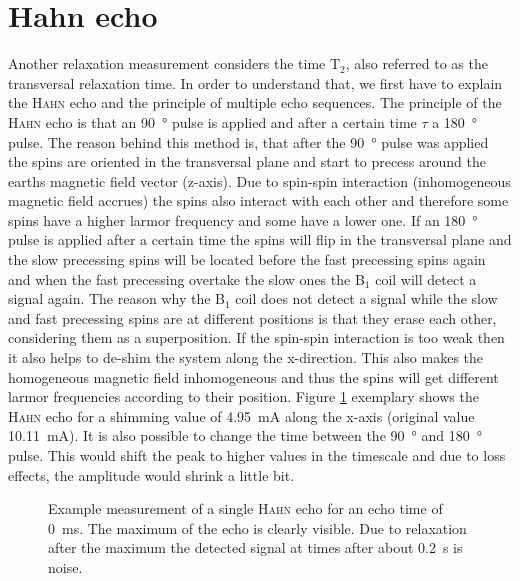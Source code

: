 \section{Hahn echo}
\label{sec:Hahnecho}
Another relaxation measurement considers the time T$_2$, also referred to as the transversal relaxation time.
In order to understand that, we first have to explain the \textsc{Hahn} echo and the principle of multiple echo sequences.\newline
The principle of the \textsc{Hahn} echo is that an \SI{90}{\degree} pulse is applied and after a certain time $\tau$ a \SI{180}{\degree} pulse.
The reason behind this method is, that after the \SI{90}{\degree} pulse was applied the spins are oriented in the transversal plane and start to precess around the earths magnetic field vector (z-axis).
Due to spin-spin interaction (inhomogeneous magnetic field accrues) the spins also interact with each other and therefore some spins have a higher larmor frequency and some have a lower one.
If an \SI{180}{\degree} pulse is applied after a certain time the spins will flip in the transversal plane and the slow precessing spins will be located before the fast precessing spins again and when the fast precessing  overtake the slow ones the B$_1$ coil will detect a signal again.
The reason why the B$_1$ coil does not detect a signal while the slow and fast precessing spins are at different positions is that they erase each other, considering them as a superposition.
If the spin-spin interaction is too weak then it also helps to de-shim the system along the x-direction.
This also makes the homogeneous magnetic field inhomogeneous and thus the spins will get different larmor frequencies according to their position.\newline
Figure \ref{fig:Echobeispeilsignal} exemplary shows the \textsc{Hahn} echo for a shimming value of \SI{4.95}{\milli \ampere} along the x-axis (original value \SI{10.11}{\milli \ampere}).
It is also possible to change the time between the \SI{90}{\degree} and \SI{180}{\degree} pulse.
This would shift the peak to higher values in the timescale and due to loss effects, the amplitude would shrink a little bit.
\begin{figure}[H]
    \centering
    
    \caption[Example measurement of a single \textsc{Hahn} echo for an echo time of \SI{0}{\milli \second}.]{Example measurement of a single \textsc{Hahn} echo for an echo time of \SI{0}{\milli \second}.
    The maximum of the echo is clearly visible.
    Due to relaxation after the maximum the detected signal at times after about \SI{0.2}{\second} is noise.}
    \label{fig:Echobeispeilsignal}
\end{figure}

